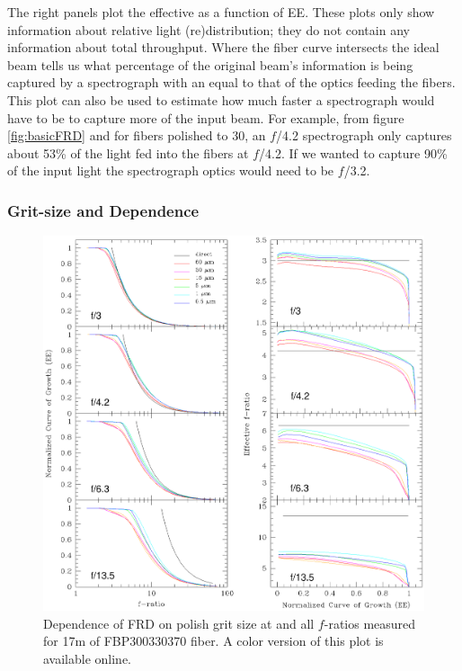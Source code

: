 The right panels plot the effective \fratio as a function of
EE. These plots only show information about relative light
(re)distribution; they do not contain any information about total
throughput.  Where the fiber curve intersects the ideal beam tells us
what percentage of the original beam's information is being captured
by a spectrograph with an \fratio equal to that of the optics feeding
the fibers. This plot can also be used to estimate how much faster a
spectrograph would have to be to capture more of the input beam. For
example, from figure \ref{fig:basicFRD} and for fibers polished to 30\mum, an $f$/4.2
spectrograph only captures about 53\% of the light fed into the fibers 
at $f$/4.2. If we wanted to capture 90\% of the input light the
spectrograph optics would need to be $f$/3.2.

\subsubsection{Grit-size and \fratio Dependence}
\label{FRD:sec:gritwave}
\begin{figure}[htp]
  \centering
  \includegraphics[width=\textwidth]{FRD/figs/gritplot.eps}
  \caption{\fixspacing\label{fig:grit}Dependence of FRD on polish grit size at
    \filty and all $f$-ratios measured for 17m of FBP300330370 fiber. A color version of this plot is available online.}
\end{figure}

